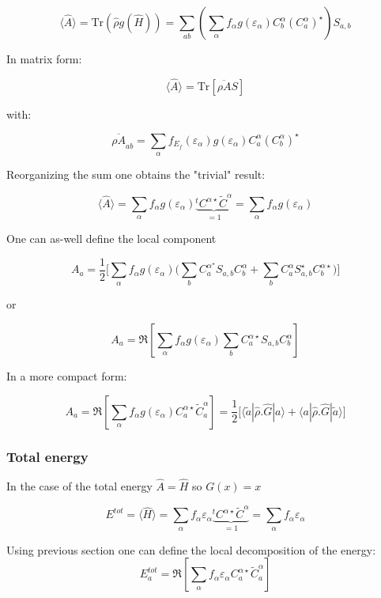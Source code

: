 \documentclass{article}
\newcommand{\bra}[1]{\langle #1|}
\newcommand{\ket}[1]{|#1\rangle}
\newcommand{\op}[1]{\hat{#1}}
\begin{document}
\[ \langle\op{A}  \rangle =\mbox{Tr} (\op{\rho} g(\op{H}))= 
\sum_{ a  b }\left(\sum_{\alpha}  f_{\alpha}g(\varepsilon_{\alpha})
 C_{b}^{\alpha}(C_{a}^{\alpha})^{\star} \right)  S_{a,b} \]


\noindent
In matrix form:

\[\langle\op{A}  \rangle = \mbox{Tr} \left[ \overline{\rho A}  S \right] \] 


\noindent
with:

\[ \overline{\rho A}_{ab}=\sum_{\alpha}  f_{E_f}(\varepsilon_{\alpha})g(\varepsilon_{\alpha})
 C_{a}^{\alpha}(C_{b}^{\alpha})^{\star}\]

\noindent
Reorganizing the sum one obtains the "trivial" result:

\[\langle\op{A}  \rangle =\sum_{\alpha } 
f_{\alpha} g(\varepsilon_{\alpha}) \underbrace{^tC^{\alpha \star}\widetilde{C}^{\alpha}}_{=1}=
\sum_{\alpha } 
f_{\alpha} g(\varepsilon_{\alpha}) \]

\noindent
One can as-well define the local component

\[ {A}_{a}=\frac{1}{2}\Bigg[\sum_{\alpha} 
f_{\alpha}g(\varepsilon_{\alpha}) 
\Bigg(\sum_{b} C_{a}^{\alpha^{\star}}S_{a,b}C_{b}^{\alpha} + \sum_{b} C_{a}^{\alpha}S_{a,b}^{\star}C_{b}^{\alpha \star}\Bigg) \Bigg]\]

\noindent
or

\[ {A}_{a }=\Re \left[ 
\sum_{\alpha}  f_{\alpha}g(\varepsilon_{\alpha}) 
\sum_{b} C_{a}^{\alpha \star} S_{a,b}C_{b}^{\alpha} \right] \]

\noindent
In a more compact form:

\[ {A}_{a} =\Re \left[ 
\sum_{\alpha} f_{\alpha}g(\varepsilon_{\alpha}) 
C_{a}^{\alpha \star}\widetilde{C}_{a}^{\alpha} \right]= 
\frac{1}{2} \Big[ \bra{\tilde{a}} \op{\rho}.\op{G} \ket{a} + \bra{a} \op{\rho}.\op{G} \ket{\tilde{a}}  \Big]
 \]

\subsubsection{Total energy}

\noindent
In the case of the total energy $\op{A}=\op{H} $ so $G(x)=x$

\[E^{tot}=\langle \op{H} \rangle=\sum_{\alpha } f_{\alpha}\varepsilon_{\alpha}
\underbrace{^tC^{\alpha \star}\widetilde{C}^{\alpha}}_{=1}= \sum_{\alpha } f_{\alpha}\varepsilon_{\alpha}\]

\noindent
Using previous section one can define the local decomposition of the energy:
\[ E^{tot}_{a} =\Re \left[ 
\sum_{\alpha} f_{\alpha}\varepsilon_{\alpha}
C_{a}^{\alpha \star}\widetilde{C}_{a}^{\alpha} \right]
 \]
    
\end{document}
